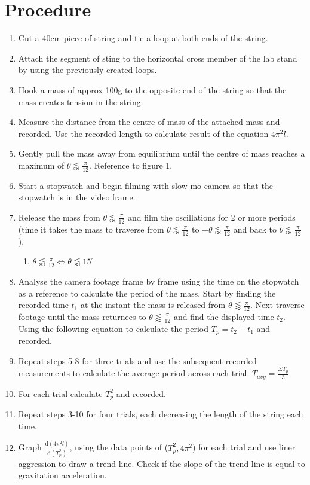 \documentclass[11pt,letterpaper]{article}
\begin{document}
\section{Procedure}
\begin{enumerate}
    \item Cut a 40cm piece of string and tie a loop at both ends of the string.
    \item Attach the segment of sting to the horizontal cross member of the lab stand by using the previously created loops. 
    \item Hook a mass of approx 100g to the opposite end of the string so that the mass creates tension in the string.  
    \item Measure the distance from the centre of mass of the attached mass and recorded. Use the recorded length to calculate result of the equation $4\pi^2l$.
    \item Gently pull the mass away from equilibrium until the centre of mass reaches a maximum of $\theta \lessapprox \frac{\pi}{12}$. Reference to figure 1.
    \item Start a stopwatch and begin filming with slow mo camera so that the stopwatch is in the video frame.
    \item Release the mass from $\theta \lessapprox \frac{\pi}{12}$ and film the oscillations for 2 or more periods (time it takes the mass to traverse from $\theta \lessapprox \frac{\pi}{12}$ to $-\theta \lessapprox \frac{\pi}{12}$ and back to $\theta \lessapprox \frac{\pi}{12}$ ).
\begin{enumerate}
    \item $\theta \lessapprox \frac{\pi}{12} \Longleftrightarrow \theta \lessapprox 15^{\circ}$
\end{enumerate}
    \item Analyse the camera footage frame by frame using the time on the stopwatch as a reference to calculate the period of the mass. Start by finding the recorded time $t_{1}$ at the instant the mass is released from $\theta \lessapprox \frac{\pi}{12}$. Next traverse footage until the mass returnees to $\theta \lessapprox \frac{\pi}{12}$ and find the displayed time $t_{2}$. Using the following equation to calculate the period $T_{p}=t_{2}-t_{1}$ and recorded. 
    \item Repeat steps 5-8 for three trials and use the subsequent recorded measurements to calculate the average period across each trial. $T_{avg}=\frac{\Sigma T_{p}}{3}$
    \item For each trial calculate $T_{p}^2$ and recorded.  
    \item Repeat steps 3-10 for four trials, each decreasing the length of the string each time.
    \item Graph $\frac{\mathrm d (4\pi^2l) }{\mathrm d (T_{p}^2)}$, using the data points of ($T_{p}^2, 4\pi^2$) for each trial and use liner aggression to draw a trend line. Check if the slope of the trend line is equal to gravitation acceleration.  

    \end{enumerate}
    \pagebreak
\end{document}
